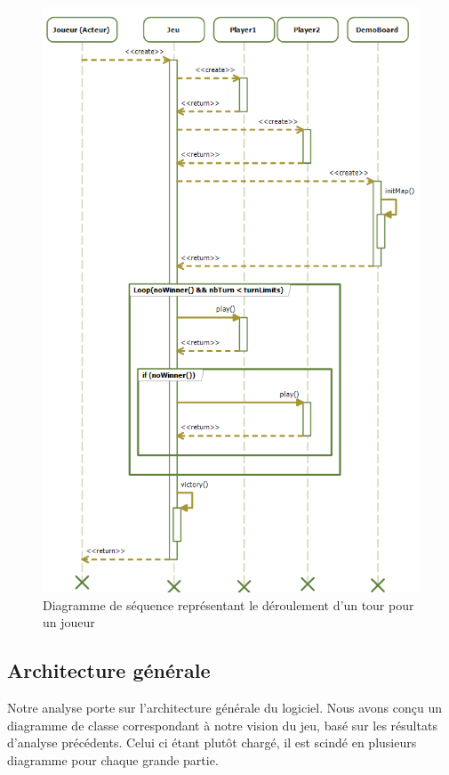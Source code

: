 \begin{figure}[!h] 
\centerline{\includegraphics[width=\textwidth]{img/sequence_jeu_ex.png}}
   \caption{\label{étiquette} Diagramme de séquence représentant le déroulement d'un tour pour un joueur}
\label{sequenceJeu}
\end{figure}

\subsection{Architecture générale}
Notre analyse porte sur l'architecture générale du logiciel. Nous avons conçu un diagramme de classe correspondant à notre vision du jeu, basé sur les résultats d'analyse précédents. Celui ci étant plutôt chargé, il est scindé en plusieurs diagramme pour chaque grande partie.

